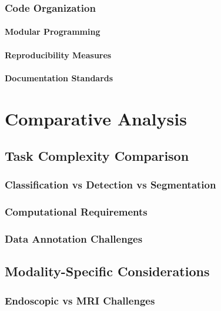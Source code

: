 \documentclass[12pt,a4paper]{report}
\begin{document}
\subsection{Code Organization}

\subsubsection{Modular Programming}

\subsubsection{Reproducibility Measures}

\subsubsection{Documentation Standards}

\chapter{Comparative Analysis}

\section{Task Complexity Comparison}

\subsection{Classification vs Detection vs Segmentation}

\subsection{Computational Requirements}

\subsection{Data Annotation Challenges}

\section{Modality-Specific Considerations}

\subsection{Endoscopic vs MRI Challenges}
\end{document}
